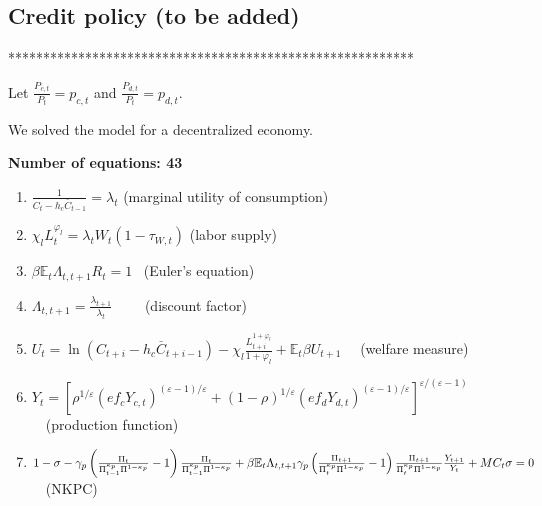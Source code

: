 \documentclass{article}
\begin{document}
\bigskip

\subsection{Credit policy (to be added)}

\bigskip

\begin{center}
**********************************************************
\end{center}

Let $\frac{P_{c,t}}{P_{t}}=p_{c,t}$ and $\frac{P_{d,t}}{P_{t}}=p_{d,t}$.

We solved the model for a decentralized economy.

\textbf{Number of equations: 43}

\begin{enumerate}
\item $\frac{1}{C_{t}-h_{c}\overset{\_}{C}_{t-1}}=\lambda _{t}$ (marginal
utility of consumption)

\item $\chi _{l}L_{t}^{\varphi _{l}}=\lambda _{t}W_{t}(1-\tau _{W,t})$
(labor supply)

\item $\beta \mathbb{E}_{t}\Lambda _{t,t+1}R_{t}=1$ \ (Euler's equation)

\item $\Lambda _{t,t+1}=\frac{\lambda _{t+1}}{\lambda _{t}}$ \ \ \ \
(discount factor)

\item $U_{t}=\ln \left( C_{t+i}-h_{c}\overset{\_}{C}_{t+i-1}\right) -\chi
_{l}\frac{L_{t+i}^{1+\varphi _{l}}}{1+\varphi _{l}}+\mathbb{E}_{t}\beta
U_{t+1}$ \ \ (welfare measure)

\item $Y_{t}=\left[ \rho ^{1/\varepsilon }\left( ef_{c}Y_{c,t}\right)
^{\left( \varepsilon -1\right) /\varepsilon }+(1-\rho )^{1/\varepsilon
}\left( ef_{d}Y_{d,t}\right) ^{\left( \varepsilon -1\right) /\varepsilon }%
\right] ^{\varepsilon /(\varepsilon -1)}$ \ \ (production function)

\item $1-\sigma -\gamma _{p}\left( \frac{\Pi _{t}}{\Pi _{t-1}^{\kappa
_{p}}\Pi ^{1-\kappa _{p}}}-1\right) \frac{\Pi _{t}}{\Pi _{t-1}^{\kappa
_{p}}\Pi ^{1-\kappa _{p}}}+\beta \mathbb{E}_{t}\Lambda _{t,t+1}\gamma
_{p}\left( \frac{\Pi _{t+1}}{\Pi _{t}^{\kappa _{p}}\Pi ^{1-\kappa _{p}}}%
-1\right) \frac{\Pi _{t+1}}{\Pi _{t}^{\kappa _{p}}\Pi ^{1-\kappa _{p}}}\frac{%
Y_{t+1}}{Y_{t}}+MC_{t}\sigma =0$ \ \ (NKPC)


\end{enumerate}
\end{document}
